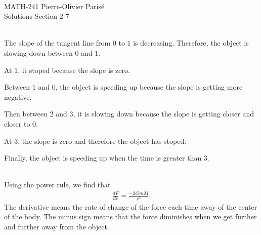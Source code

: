 


	\noindent \hrulefill \\
	MATH-241 \hfill Pierre-Olivier Paris{\'e}\\
	Solutions Section 2-7 \hfill \semester \\\vspace*{-1cm}
	
	\noindent\hrulefill
	
	\spc
	
	\\
	The slope of the tangent line from $0$ to $1$ is decreasing. Therefore, the object is slowing down between $0$ and $1$. 
	
	At $1$, it stoped because the slope is zero. 
	
	Between $1$ and $0$, the object is speeding up because the slope is getting more negative. 
	
	Then between $2$ and $3$, it is slowing down because the slope is getting closer and closer to $0$. 
	
	At $3$, the slope is zero and therefore the object has stoped.
	
	Finally, the object is speeding up when the time is greater than $3$. 
	
	\spc
	
	\\
	Using the power rule, we find that
		\begin{align*}
		\frac{dF}{dr} = \frac{-2 GmM}{r^3} .
		\end{align*}
	The derivative means the rate of change of the force each time away of the center of the body. The minus sign means that the force diminishes when we get further and further away from the object.
	
